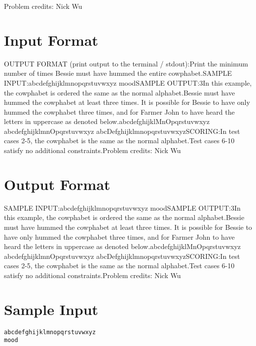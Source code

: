 \documentclass[12pt]{article}
\begin{document}
Problem credits: Nick Wu



\section*{Input Format}
OUTPUT FORMAT (print output to the terminal / stdout):Print the minimum number of times Bessie must have hummed the entire cowphabet.SAMPLE INPUT:abcdefghijklmnopqrstuvwxyz
moodSAMPLE OUTPUT:3In this example, the cowphabet is ordered the same as the normal alphabet.Bessie must have hummed the cowphabet at least three times. It is possible for
Bessie to have only hummed the cowphabet three times, and for Farmer John to
have heard the letters in uppercase as denoted below.abcdefghijklMnOpqrstuvwxyz
abcdefghijklmnOpqrstuvwxyz
abcDefghijklmnopqrstuvwxyzSCORING:In test cases 2-5, the cowphabet is the same as the normal alphabet.Test cases 6-10 satisfy no additional constraints.Problem credits: Nick Wu

\section*{Output Format}
SAMPLE INPUT:abcdefghijklmnopqrstuvwxyz
moodSAMPLE OUTPUT:3In this example, the cowphabet is ordered the same as the normal alphabet.Bessie must have hummed the cowphabet at least three times. It is possible for
Bessie to have only hummed the cowphabet three times, and for Farmer John to
have heard the letters in uppercase as denoted below.abcdefghijklMnOpqrstuvwxyz
abcdefghijklmnOpqrstuvwxyz
abcDefghijklmnopqrstuvwxyzSCORING:In test cases 2-5, the cowphabet is the same as the normal alphabet.Test cases 6-10 satisfy no additional constraints.Problem credits: Nick Wu

\section*{Sample Input}
\begin{verbatim}
abcdefghijklmnopqrstuvwxyz
mood
\end{verbatim}
\end{document}
